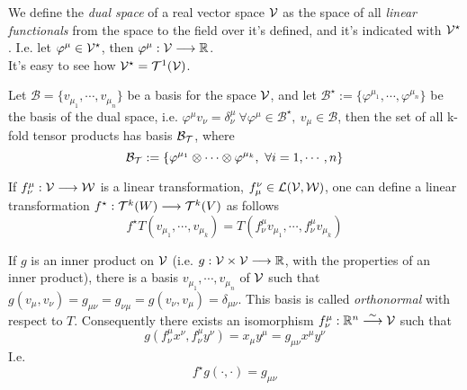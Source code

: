 \documentclass[../complete.tex]{subfiles}
\begin{document}
\begin{dfn}
	We define the \textit{dual space} of a real vector space $\V$ as the space of all \textit{linear functionals} from the space to the field over it's defined, and it's indicated with $\V^{\star}$. I.e. let $\varphi^\mu\in\V^{\star}$, then $\varphi^\mu:\V\fto\R$.\\
	It's easy to see how $\V^{\star}=\tpwr^1(\V)$.
\end{dfn}
\begin{thm}
	Let $\mathcal{B}=\{v_{\mu_1},\cdots,v_{\mu_n}\}$ be a basis for the space $\V$, and let $\mathcal{B}^{\star}:=\{\varphi^{\mu_1},\cdots,\varphi^{\mu_n}\}$ be the basis of the dual space, i.e. $\varphi^\mu v_\nu=\delta^\mu_\nu\ \forall\varphi^\mu\in\mathcal{B}^\star,\ v_\mu\in\mathcal{B}$, then the set of all k-fold tensor products has basis $\mathcal{B}_\tpwr$, where
	\begin{equation}
		\mathcal{B}_\tpwr:=\{\varphi^{\mu_1}\otimes\cdots\otimes\varphi^{\mu_k},\ \forall i=1,\cdots,n\}
		\label{eq:tensorbasis}
	\end{equation}
\end{thm}
\begin{thm}
	If $f^\mu_\nu:\V\fto\W$ is a linear transformation, $f^\nu_\mu\in\mathcal{L}(\V,\W)$, one can define a linear transformation $f^\star:\tpwr^k(W)\fto\tpwr^k(V)$ as follows
	\begin{equation*}
		f^\star T(v_{\mu_1},\cdots,v_{\mu_k})=T(f^\mu_\nu v_{\mu_1},\cdots,f_\nu^\mu v_{\mu_k})
	\end{equation*}
\end{thm}
\begin{thm}
	If $g$ is an inner product on $\V$ (i.e. $g:\V\times\V\fto\R$, with the properties of an inner product), there is a basis $v_{\mu_1},\cdots,v_{\mu_n}$ of $\V$ such that $g(v_\mu,v_\nu)=g_{\mu\nu}=g_{\nu\mu}=g(v_\nu,v_\mu)=\delta_{\mu\nu}$. This basis is called \textit{orthonormal} with respect to $T$. Consequently there exists an isomorphism $f^\mu_\nu:\R^n\fto[\sim]\V$ such that
	\begin{equation}
		g(f^\mu_\nu x^\nu,f^\mu_\nu y^\nu)=x_\mu y^\mu=g_{\mu\nu}x^\mu y^\nu
	\end{equation}
	I.e.
	\begin{equation}
		f^\star g(\cdot,\cdot)=g_{\mu\nu}
	\end{equation}
\end{thm}
\end{document}
